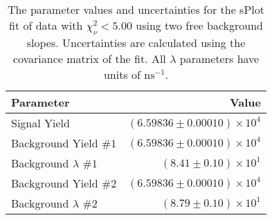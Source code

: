 
\begin{table}[ht]
    \begin{center}
        \begin{tabular}{lr}\toprule
            Parameter & Value \\\midrule
            Signal Yield & $(6.59836 \pm 0.00010) \times 10^{4}$ \\
            Background Yield $\#1$ & $(6.59836 \pm 0.00010) \times 10^{4}$ \\
            Background $\lambda$ $\#1$ & $(8.41 \pm 0.10) \times 10^{1}$ \\
            Background Yield $\#2$ & $(6.59836 \pm 0.00010) \times 10^{4}$ \\
            Background $\lambda$ $\#2$ & $(8.79 \pm 0.10) \times 10^{1}$ \\\bottomrule
        \end{tabular}
        \caption{The parameter values and uncertainties for the sPlot fit of data with $\chi^2_\nu < 5.00$ using two free background slopes. Uncertainties are calculated using the covariance matrix of the fit. All $\lambda$ parameters have units of $\si{\nano\second}^{-1}$.}\label{tab:splot-fit-results-chisqdof-5.00-free-2}
    \end{center}
\end{table}
